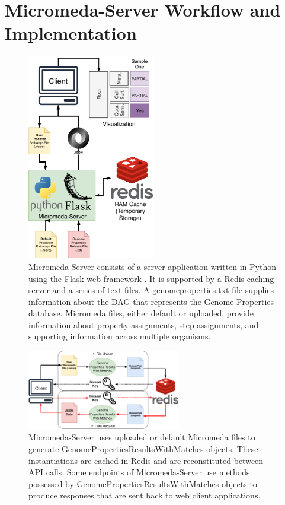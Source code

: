 \section{Micromeda-Server Workflow and Implementation} \label{server-workflow}

\begin{figure}[!ht]
  \centering
	\includegraphics[width=0.50\textwidth]{media/Micromeda-Server.pdf}
	 \caption{Micromeda-Server consists of a server application written in Python using the Flask web framework \cite{grinberg2018flask}. It is supported by a Redis caching server and a series of text files. A genomeproperties.txt file supplies information about the DAG that represents the Genome Properties database. Micromeda files, either default or uploaded, provide information about property assignments, step assignments, and supporting information across multiple organisms.}
	 \label{fig:micromeda-server}
\end{figure}

\begin{figure}[!ht]
  \centering
	\includegraphics[width=0.60\textwidth]{media/Micromeda-Server-Workflow.pdf}
	 \caption{Micromeda-Server uses uploaded or default Micromeda files to generate GenomePropertiesResultsWithMatches objects. These instantiations are cached in Redis and are reconstituted between API calls. Some endpoints of Micromeda-Server use methods possessed by GenomePropertiesResultsWithMatches objects to produce responses that are sent back to web client applications.}
	 \label{fig:micromeda-server-workflow}
\end{figure}

